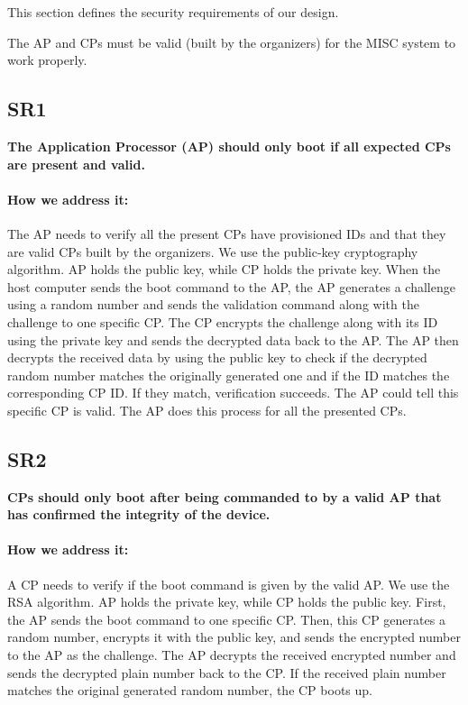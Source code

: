 \documentclass[11pt,oneside,onecolumn,letterpaper]{article}
\newcounter{alg}
\begin{document}
	This section defines the security requirements of our design.
	
	The AP and CPs must be valid (built by the organizers) for the MISC system to work properly.
	
	\subsection{SR1}
	\textbf{The Application Processor (AP) should only boot if all expected CPs are present and valid.}
	\paragraph{How we address it:}
	The AP needs to verify all the present CPs have provisioned IDs and that they are valid CPs built by the organizers.
	We use the public-key cryptography algorithm.
	AP holds the public key,
	while CP holds the private key.
	When the host computer sends the boot command to the AP,
	the AP generates a challenge using a random number and sends the validation command along with the challenge to one specific CP.
	The CP encrypts the challenge along with its ID using the private key and sends the decrypted data back to the AP.
	The AP then decrypts the received data by using the public key to check if the decrypted random number matches the originally generated one and if the ID matches the corresponding CP ID.
	If they match,
	verification succeeds.
	The AP could tell this specific CP is valid.
	The AP does this process for all the presented CPs.
	
	\subsection{SR2}
	\textbf{CPs should only boot after being commanded to by a valid AP that has confirmed the integrity of the device.}
	\paragraph{How we address it:}
	A CP needs to verify if the boot command is given by the valid AP.
	We use the RSA algorithm.
	AP holds the private key,
	while CP holds the public key.
	First, the AP sends the boot command to one specific CP.
	Then,
	this CP generates a random number,
	encrypts it with the public key,
	and sends the encrypted number to the AP as the challenge.
	The AP decrypts the received encrypted number and sends the decrypted plain number back to the CP.
	If the received plain number matches the original generated random number,
	the CP boots up.
	
\end{document}
